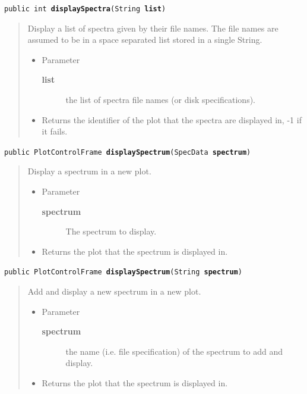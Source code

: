 \documentclass[twoside,11pt]{article}
\renewcommand{\_}{\texttt{\symbol{95}}}
\newcommand{\method}[1]{\texttt{#1}}
\newenvironment{desc}{\begin{quote}}{\end{quote}}
\begin{document}
\method{public int \textbf{displaySpectra}(\texttt{String} \textbf{list})\label{l354}\label{l355}}
\begin{desc}Display a list of spectra given by their file names. The file
 names are assumed to be in a space separated list stored in a
 single String.
\begin{itemize}
\item{Parameter
  \begin{description}
   \item[\textbf{list}]{the list of spectra file names (or disk
             specifications).}
  \end{description}}
\end{itemize}
\begin{itemize}
\item{Returns the identifier of the plot that the spectra are
         displayed in, -1 if it fails. }
\end{itemize}
\end{desc}

\method{public PlotControlFrame \textbf{displaySpectrum}(\texttt{SpecData} \textbf{spectrum})\label{l356}\label{l357}}
\begin{desc}Display a spectrum in a new plot.
\begin{itemize}
\item{Parameter
  \begin{description}
   \item[\textbf{spectrum}]{The spectrum to display.}
  \end{description}}
\end{itemize}
\begin{itemize}
\item{Returns the plot that the spectrum is displayed in. }
\end{itemize}
\end{desc}

\method{public PlotControlFrame \textbf{displaySpectrum}(\texttt{String} \textbf{spectrum})\label{l358}\label{l359}}
\begin{desc}Add and display a new spectrum in a new plot.
\begin{itemize}
\item{Parameter
  \begin{description}
   \item[\textbf{spectrum}]{the name (i.e. file specification) of the spectrum
                 to add and display.}
  \end{description}}
\end{itemize}
\begin{itemize}
\item{Returns the plot that the spectrum is displayed in. }
\end{itemize}
\end{desc}
\end{document}
